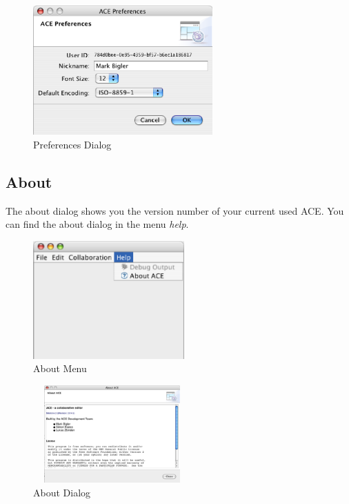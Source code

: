 \documentclass[11pt,a4paper]{article}
\begin{document}
\begin{figure}[H]
\begin{center}
  \includegraphics[height=1.95in, width=2.71in]{../images/usermanual/ace_preferences.eps}
\caption{Preferences Dialog}
\label{view_preferences_dialog}
\end{center}
\end{figure}

\subsection{About}
The about dialog shows you the version number of your current used ACE. You can find the about dialog in the menu \textit{help}.
\begin{figure}[H]
\begin{center}
  \includegraphics[height=1.78in, width=2.28in]{../images/usermanual/menu_help.eps}
\caption{About Menu}
\label{menu_about}
\end{center}
\end{figure}

\begin{figure}[H]
\begin{center}
  \includegraphics[height=1.47in, width=2.39in]{../images/usermanual/ace_about.eps}
\caption{About Dialog}
\label{dialog_about}
\end{center}
\end{figure}
\end{document}
